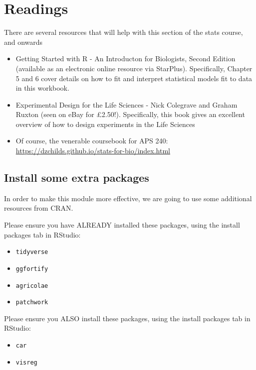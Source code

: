 \documentclass[
]{book}
\providecommand{\tightlist}{%
  \setlength{\itemsep}{0pt}\setlength{\parskip}{0pt}}
\begin{document}
\hypertarget{readings}{%
\chapter{Readings}\label{readings}}

There are several resources that will help with this section of the stats course, and onwards

\begin{itemize}
\tightlist
\item
  Getting Started with R - An Introducton for Biologists, Second Edition (available as an electronic online resource via StarPlus). Specifically, Chapter 5 and 6 cover details on how to fit and interpret statistical models fit to data in this workbook.
\item
  Experimental Design for the Life Sciences - Nick Colegrave and Graham Ruxton (seen on eBay for £2.50!). Specifically, this book gives an excellent overview of how to design experiments in the Life Sciences
\item
  Of course, the venerable coursebook for APS 240: \url{https://dzchilds.github.io/stats-for-bio/index.html}
\end{itemize}

\hypertarget{install-some-extra-packages}{%
\section{Install some extra packages}\label{install-some-extra-packages}}

In order to make this module more effective, we are going to use some additional resources from CRAN.

Please ensure you have ALREADY installed these packages, using the install packages tab in RStudio:

\begin{itemize}
\tightlist
\item
  \texttt{tidyverse}
\item
  \texttt{ggfortify}
\item
  \texttt{agricolae}
\item
  \texttt{patchwork}
\end{itemize}

Please ensure you ALSO install these packages, using the install packages tab in RStudio:

\begin{itemize}
\tightlist
\item
  \texttt{car}
\item
  \texttt{visreg}
\end{itemize}
\end{document}
